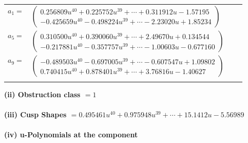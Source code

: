\documentclass[1p]{elsarticle_modified}
\theoremstyle{definition}
\begin{document}
\begin{tabular}{m{7pt} m{180pt} m{7pt} m{180pt} }
\flushright $a_{1}=$&$\begin{pmatrix}0.256809 u^{40}+0.225752 u^{39}+\cdots+0.311912 u-1.57195\\-0.425659 u^{40}-0.498224 u^{39}+\cdots-2.23020 u+1.85234\end{pmatrix}$ \\
\flushright $a_{5}=$&$\begin{pmatrix}0.310500 u^{40}+0.390060 u^{39}+\cdots+2.49670 u+0.134544\\-0.217881 u^{40}-0.357757 u^{39}+\cdots-1.00603 u-0.677160\end{pmatrix}$ \\
\flushright $a_{9}=$&$\begin{pmatrix}-0.489503 u^{40}-0.697005 u^{39}+\cdots-0.607547 u+1.09802\\0.740415 u^{40}+0.878401 u^{39}+\cdots+3.76816 u-1.40627\end{pmatrix}$\\&\end{tabular}
\flushleft \textbf{(ii) Obstruction class $= 1$}\\~\\
\flushleft \textbf{(iii) Cusp Shapes $= 0.495461 u^{40}+0.975948 u^{39}+\cdots+15.1412 u-5.56989$}\\~\\
\newpage\renewcommand{\arraystretch}{1}
\flushleft \textbf{(iv) u-Polynomials at the component}\newline \\
\end{document}
